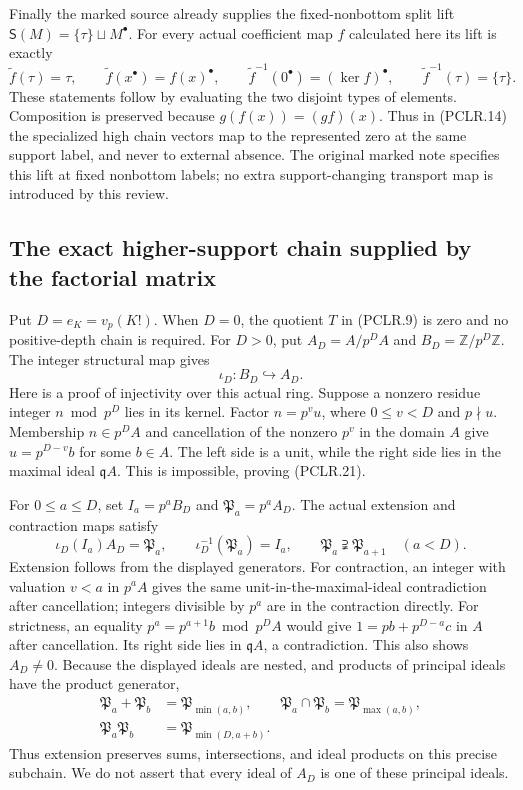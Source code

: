 Finally the marked source already supplies the fixed-nonbottom
split lift \(\mathsf S(M)=\{\tau\}\sqcup M^\bullet\).
For every actual coefficient map \(f\) calculated here its lift
is exactly
\[
 \widetilde f(\tau)=\tau,\qquad
 \widetilde f(x^\bullet)=f(x)^\bullet,\qquad
 \widetilde f^{-1}(0^\bullet)=(\ker f)^\bullet,\qquad
 \widetilde f^{-1}(\tau)=\{\tau\}.
 \tag{PCLR.20}
\]
These statements follow by evaluating the two disjoint types
of elements. Composition is preserved because
\(g(f(x))=(gf)(x)\). Thus in (PCLR.14) the specialized high
chain vectors map to the represented zero at the same support
label, and never to external absence. The original marked note
specifies this lift at fixed nonbottom labels; no extra
support-changing transport map is introduced by this review.

\subsection{The exact higher-support chain supplied by the factorial matrix}

Put \(D=e_K=v_p(K!)\). When \(D=0\), the quotient \(T\) in
(PCLR.9) is zero and no positive-depth chain is required. For
\(D>0\), put \(A_D=A/p^DA\) and
\(B_D=\mathbb Z/p^D\mathbb Z\). The integer structural map gives
\[
 \iota_D:B_D\hookrightarrow A_D.
 \tag{PCLR.21}
\]
Here is a proof of injectivity over this actual ring. Suppose a
nonzero residue integer \(n\bmod p^D\) lies in its kernel. Factor
\(n=p^vu\), where \(0\leq v<D\) and \(p\nmid u\). Membership
\(n\in p^DA\) and cancellation of the nonzero \(p^v\) in the
domain \(A\) give \(u=p^{D-v}b\) for some \(b\in A\). The left
side is a unit, while the right side lies in the maximal ideal
\(\mathfrak qA\). This is impossible, proving (PCLR.21).

For \(0\leq a\leq D\), set \(I_a=p^aB_D\) and
\(\mathfrak P_a=p^aA_D\). The actual extension and contraction
maps satisfy
\[
 \iota_D(I_a)A_D=\mathfrak P_a,
 \qquad \iota_D^{-1}(\mathfrak P_a)=I_a,
 \qquad \mathfrak P_a\supsetneqq\mathfrak P_{a+1}
                 \quad(a<D).
 \tag{PCLR.22}
\]
Extension follows from the displayed generators. For contraction,
an integer with valuation \(v<a\) in \(p^aA\) gives the same
unit-in-the-maximal-ideal contradiction after cancellation;
integers divisible by \(p^a\) are in the contraction directly.
For strictness, an equality
\(p^a=p^{a+1}b\bmod p^DA\) would give
\(1=pb+p^{D-a}c\) in \(A\) after cancellation. Its right side
lies in \(\mathfrak qA\), a contradiction. This also shows
\(A_D\ne0\). Because the displayed ideals are nested, and
products of principal ideals have the product generator,
\[
 \begin{split}
 \mathfrak P_a+\mathfrak P_b&=\mathfrak P_{\min(a,b)},\qquad
 \mathfrak P_a\cap\mathfrak P_b=\mathfrak P_{\max(a,b)},\\
 \mathfrak P_a\mathfrak P_b&=\mathfrak P_{\min(D,a+b)}.
 \end{split}
 \tag{PCLR.23}
\]
Thus extension preserves sums, intersections, and ideal products
on this precise subchain. We do not assert that every ideal of
\(A_D\) is one of these principal ideals.

